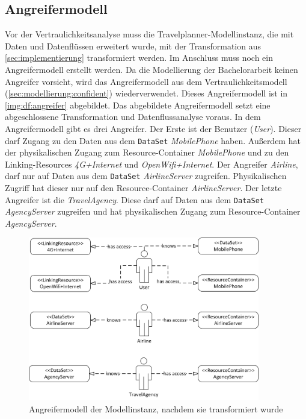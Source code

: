 \subsection{Angreifermodell}
Vor der Vertraulichkeitsanalyse muss die Travelplanner-Modellinstanz, die mit Daten und Datenflüssen erweitert wurde, mit der Transformation aus \autoref{sec:implementierung} transformiert werden. Im Anschluss muss noch ein Angreifermodell erstellt werden. Da die Modellierung der Bachelorarbeit keinen Angreifer vorsieht, wird das Angreifermodell aus dem Vertraulichkeitsmodell (\autoref{sec:modellierung:confident}) wiederverwendet. Dieses Angreifermodell ist in \autoref{img:df:angreifer} abgebildet. Das abgebildete Angreifermodell setzt eine abgeschlossene Transformation und Datenflussanalyse voraus. In dem Angreifermodell gibt es drei Angreifer. Der Erste ist der Benutzer (\textit{User}). Dieser darf Zugang zu den Daten aus dem \texttt{DataSet} \textit{MobilePhone} haben. Außerdem hat der physikalischen Zugang zum Resource-Container \textit{MobilePhone} und zu den Linking-Resources \textit{4G+Internet} und \textit{OpenWifi+Internet}. Der Angreifer \textit{Airline}, darf nur auf Daten aus dem \texttt{DataSet} \textit{AirlineServer} zugreifen. Physikalischen Zugriff hat dieser nur auf den Resource-Container \textit{AirlineServer}. Der letzte Angreifer ist die \textit{TravelAgency}. Diese darf auf Daten aus dem \texttt{DataSet} \textit{AgencyServer} zugreifen und hat physikalischen Zugang zum Resource-Container \textit{AgencyServer}.

\begin{figure}[h]
	\centering
  	\includegraphics[width=0.9\textwidth]{images/travelplanner_angreifer.png}
	\caption{Angreifermodell der Modellinstanz, nachdem sie transformiert wurde}
	\label{img:df:angreifer}
\end{figure}

